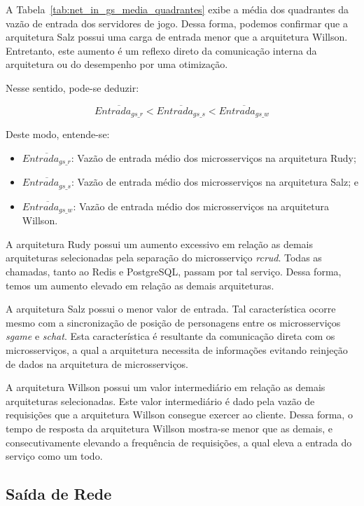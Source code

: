 A Tabela~\ref{tab:net_in_gs_media_quadrantes} exibe a média dos quadrantes da vazão de entrada dos servidores de jogo.
%
Dessa forma, podemos confirmar que a arquitetura Salz possui uma carga de entrada menor que a arquitetura Willson.
%
Entretanto, este aumento é um reflexo direto da comunicação interna da arquitetura ou do desempenho por uma otimização.

Nesse sentido, pode-se deduzir:

$$
    \overline{Entrada_{gs\_r}} < \overline{Entrada_{gs\_s}} < \overline{Entrada_{gs\_w}}
$$

Deste modo, entende-se:

\begin{itemize}
 \item $\overline{Entrada_{gs\_r}}$: Vazão de entrada médio dos microsserviços na arquitetura Rudy;
 \item $\overline{Entrada_{gs\_s}}$: Vazão de entrada médio dos microsserviços na arquitetura Salz; e
 \item $\overline{Entrada_{gs\_w}}$: Vazão de entrada médio dos microsserviços na arquitetura Willson.
\end{itemize}

A arquitetura Rudy possui um aumento excessivo em relação as demais arquiteturas selecionadas pela separação do microsserviço \textit{rcrud}.
%
Todas as chamadas, tanto ao Redis e PostgreSQL, passam por tal serviço.
%
Dessa forma, temos um aumento elevado em relação as demais arquiteturas.

A arquitetura Salz possui o menor valor de entrada.
%
Tal característica ocorre mesmo com a sincronização de posição de personagens entre os microsserviços \textit{sgame} e \textit{schat}.
%
Esta característica é resultante da comunicação direta com os microsserviços, a qual a arquitetura necessita de informações evitando reinjeção de dados na arquitetura de microsserviços.

A arquitetura Willson possui um valor intermediário em relação as demais arquiteturas selecionadas.
%
Este valor intermediário é dado pela vazão de requisições que a arquitetura Willson consegue exercer ao cliente.
%
Dessa forma, o tempo de resposta da arquitetura Willson  mostra-se menor que as demais, e consecutivamente elevando a frequência de requisições, a qual eleva a entrada do serviço como um todo.

\subsection{Saída de Rede}

